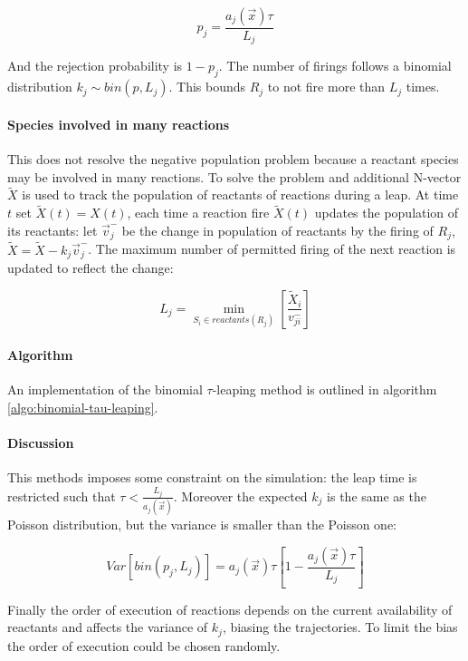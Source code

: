       $$p_j = \frac{a_j(\vec{x})\tau}{L_j}$$

      And the rejection probability is $1-p_j$.
      The number of firings follows a binomial distribution $k_j\sim bin(p, L_j)$.
      This bounds $R_j$ to not fire more than $L_j$ times.

      \paragraph{Species involved in many reactions}
      This does not resolve the negative population problem because a reactant species may be involved in many reactions.
      To solve the problem and additional N-vector $\tilde{X}$ is used to track the population of reactants of reactions during a leap.
      At time $t$ set $\tilde{X}(t) = X(t)$, each time a reaction fire $\tilde{X}(t)$ updates the population of its reactants: let $\vec{v}_j^-$ be the change in population of reactants by the firing of $R_j$, $\tilde{X} = \tilde{X}-k_j\vec{v}_j^-$.
      The maximum number of permitted firing of the next reaction is updated to reflect the change:

      $$L_j = \min\limits_{S_i\in reactants(R_j)}\left[\frac{\tilde{X}_i}{v_{ji}^-}\right]$$

      \paragraph{Algorithm}
      An implementation of the binomial $\tau$-leaping method is outlined in algorithm \ref{algo:binomial-tau-leaping}.

      

      \paragraph{Discussion}
      This methods imposes some constraint on the simulation: the leap time is restricted such that $\tau<\frac{L_j}{a_j(\vec{x})}$.
      Moreover the expected $k_j$ is the same as the Poisson distribution, but the variance is smaller than the Poisson one:

      $$Var[bin(p_j, L_j)] = a_j(\vec{x})\tau\left[1-\frac{a_j(\vec{x})\tau}{L_j}\right]$$

      Finally the order of execution of reactions depends on the current availability of reactants and affects the variance of $k_j$, biasing the trajectories.
      To limit the bias the order of execution could be chosen randomly.

